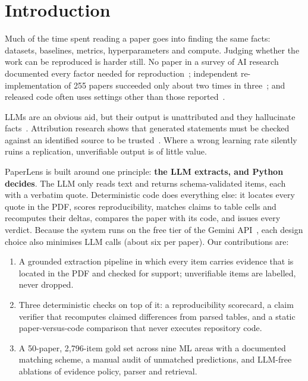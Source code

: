 \documentclass[conference]{IEEEtran}
\begin{document}
\section{Introduction}

Much of the time spent reading a paper goes into finding the same facts: datasets,
baselines, metrics, hyperparameters and compute. Judging whether the work can be reproduced
is harder still. No paper in a survey of AI research documented every factor needed for
reproduction~\cite{gundersen2018state}; independent re-implementation of 255 papers
succeeded only about two times in three~\cite{raff2019step}; and released code often uses
settings other than those reported~\cite{pineau2021improving,collberg2016repeatability}.

LLMs are an obvious aid, but their output is unattributed and they hallucinate
facts~\cite{ji2023hallucination}. Attribution research shows that generated statements must
be checked against an identified source to be trusted~\cite{rashkin2023ais,gao2023alce}.
Where a wrong learning rate silently ruins a replication, unverifiable output is of little
value.

PaperLens is built around one principle: \textbf{the LLM extracts, and Python decides}. The
LLM only reads text and returns schema-validated items, each with a verbatim quote.
Deterministic code does everything else: it locates every quote in the PDF, scores
reproducibility, matches claims to table cells and recomputes their deltas, compares the
paper with its code, and issues every verdict. Because the system runs on the free tier of
the Gemini API~\cite{gemini2023}, each design choice also minimises LLM calls (about six
per paper). Our contributions are:
\begin{enumerate}
\item A grounded extraction pipeline in which every item carries evidence that is located
  in the PDF and checked for support; unverifiable items are labelled, never dropped.
\item Three deterministic checks on top of it: a reproducibility scorecard, a claim
  verifier that recomputes claimed differences from parsed tables, and a static
  paper-versus-code comparison that never executes repository code.
\item A 50-paper, 2{,}796-item gold set across nine ML areas with a documented matching
  scheme, a manual audit of unmatched predictions, and LLM-free ablations of evidence
  policy, parser and retrieval.
\end{enumerate}
\end{document}
